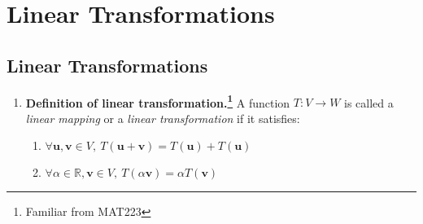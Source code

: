\documentclass[oneside, 12pt]{book}
\newcommand{\settag}[1]{\renewcommand{\theenumi}{#1}}
\newcommand{\R}{\mathbb{R}}
\newcommand{\tbf}[1]{\textbf{#1}}
\newcommand{\tit}[1]{\textit{#1}}
\begin{document}
\chapter{Linear Transformations}
\section{Linear Transformations}

    \begin{enumerate}
        \settag{2.1.1}
        \item \tbf{Definition of linear transformation.\footnote{Familiar from MAT223}} A function $T:V\xrightarrow{}W$ is called a \tit{linear mapping} or a \tit{linear transformation} if it satisfies:
        \begin{enumerate}
            \item $\forall \mathbf{u},\mathbf{v}\in V,~T(\mathbf{u} + \mathbf{v}) = T(\mathbf{u}) + T(\mathbf{u})$
            \item $\forall \alpha \in \R, \mathbf{v} \in V,~ T(\alpha\mathbf{v}) = \alpha T(\mathbf{v})$
        \end{enumerate}
        

\end{enumerate}
\end{document}
